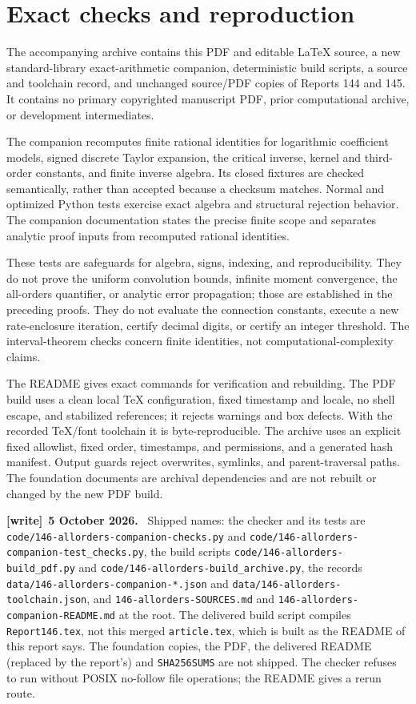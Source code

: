 \documentclass[11pt,letterpaper]{article}
\theoremstyle{remark}\newtheorem{remark}[theorem]{Remark}
\numberwithin{equation}{section}
\newcommand{\file}[1]{\nolinkurl{#1}}
\newenvironment{writenote}[1][]{\par\smallskip\begingroup\small
 \noindent\textbf{[write]}\if\relax\detokenize{#1}\relax\else~\textbf{#1.}\fi\ }%
 {\par\endgroup\smallskip}
\begin{document}
\section{Exact checks and reproduction}\label{ppg:all:sec:reproduction}
The accompanying archive contains this PDF and editable LaTeX source, a new standard-library exact-arithmetic companion, deterministic build scripts, a source and toolchain record, and unchanged source/PDF copies of Reports 144 and 145. It contains no primary copyrighted manuscript PDF, prior computational archive, or development intermediates.

The companion recomputes finite rational identities for logarithmic coefficient models, signed discrete Taylor expansion, the critical inverse, kernel and third-order constants, and finite inverse algebra. Its closed fixtures are checked semantically, rather than accepted because a checksum matches. Normal and optimized Python tests exercise exact algebra and structural rejection behavior. The companion documentation states the precise finite scope and separates analytic proof inputs from recomputed rational identities.

These tests are safeguards for algebra, signs, indexing, and reproducibility. They do not prove the uniform convolution bounds, infinite moment convergence, the all-orders quantifier, or analytic error propagation; those are established in the preceding proofs. They do not evaluate the connection constants, execute a new rate-enclosure iteration, certify decimal digits, or certify an integer threshold. The interval-theorem checks concern finite identities, not computational-complexity claims.

The README gives exact commands for verification and rebuilding. The PDF build uses a clean local TeX configuration, fixed timestamp and locale, no shell escape, and stabilized references; it rejects warnings and box defects. With the recorded TeX/font toolchain it is byte-reproducible. The archive uses an explicit fixed allowlist, fixed order, timestamps, and permissions, and a generated hash manifest. Output guards reject overwrites, symlinks, and parent-traversal paths. The foundation documents are archival dependencies and are not rebuilt or changed by the new PDF build.
\begin{writenote}[5 October 2026]
Shipped names: the checker and its tests are \file{code/146-allorders-companion-checks.py} and \file{code/146-allorders-companion-test_checks.py}, the build scripts \file{code/146-allorders-build_pdf.py} and \file{code/146-allorders-build_archive.py}, the records \file{data/146-allorders-companion-*.json} and \file{data/146-allorders-toolchain.json}, and \file{146-allorders-SOURCES.md} and \file{146-allorders-companion-README.md} at the root. The delivered build script compiles \file{Report146.tex}, not this merged \file{article.tex}, which is built as the README of this report says. The foundation copies, the PDF, the delivered README (replaced by the report's) and \file{SHA256SUMS} are not shipped. The checker refuses to run without POSIX no-follow file operations; the README gives a rerun route.
\end{writenote}
\end{document}
